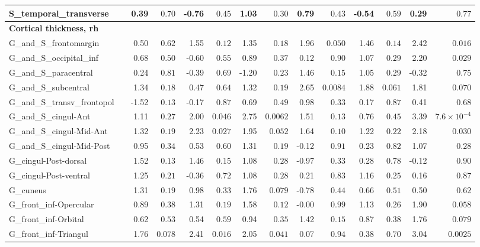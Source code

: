 {\begin{longtable}{llrrrrrrrrrrrr}
S\_temporal\_transverse &  & 0.39 & $0.70$ & -0.76 & $0.45$ & 1.03 & $0.30$ & 0.79 & $0.43$ & -0.54 & $0.59$ & 0.29 & $0.77$ \\
\midrule\multicolumn{14}{l}{\textbf{Cortical thickness, rh}} \\
G\_and\_S\_frontomargin &  & 0.50 & $0.62$ & 1.55 & $0.12$ & 1.35 & $0.18$ & 1.96 & $0.050$ & 1.46 & $0.14$ & 2.42 & $0.016$ \\
G\_and\_S\_occipital\_inf &  & 0.68 & $0.50$ & -0.60 & $0.55$ & 0.89 & $0.37$ & 0.12 & $0.90$ & 1.07 & $0.29$ & 2.20 & $0.029$ \\
G\_and\_S\_paracentral &  & 0.24 & $0.81$ & -0.39 & $0.69$ & -1.20 & $0.23$ & 1.46 & $0.15$ & 1.05 & $0.29$ & -0.32 & $0.75$ \\
G\_and\_S\_subcentral &  & 1.34 & $0.18$ & 0.47 & $0.64$ & 1.32 & $0.19$ & 2.65 & $0.0084$ & 1.88 & $0.061$ & 1.81 & $0.070$ \\
G\_and\_S\_transv\_frontopol &  & -1.52 & $0.13$ & -0.17 & $0.87$ & 0.69 & $0.49$ & 0.98 & $0.33$ & 0.17 & $0.87$ & 0.41 & $0.68$ \\
G\_and\_S\_cingul-Ant &  & 1.11 & $0.27$ & 2.00 & $0.046$ & 2.75 & $0.0062$ & 1.51 & $0.13$ & 0.76 & $0.45$ & 3.39 & $7.6{\times}10^{-4}$ \\
G\_and\_S\_cingul-Mid-Ant &  & 1.32 & $0.19$ & 2.23 & $0.027$ & 1.95 & $0.052$ & 1.64 & $0.10$ & 1.22 & $0.22$ & 2.18 & $0.030$ \\
G\_and\_S\_cingul-Mid-Post &  & 0.95 & $0.34$ & 0.53 & $0.60$ & 1.31 & $0.19$ & -0.12 & $0.91$ & 0.23 & $0.82$ & 1.07 & $0.28$ \\
G\_cingul-Post-dorsal &  & 1.52 & $0.13$ & 1.46 & $0.15$ & 1.08 & $0.28$ & -0.97 & $0.33$ & 0.28 & $0.78$ & -0.12 & $0.90$ \\
G\_cingul-Post-ventral &  & 1.25 & $0.21$ & -0.36 & $0.72$ & 1.08 & $0.28$ & 0.21 & $0.83$ & 1.16 & $0.25$ & 0.16 & $0.87$ \\
G\_cuneus &  & 1.31 & $0.19$ & 0.98 & $0.33$ & 1.76 & $0.079$ & -0.78 & $0.44$ & 0.66 & $0.51$ & 0.50 & $0.62$ \\
G\_front\_inf-Opercular &  & 0.89 & $0.38$ & 1.31 & $0.19$ & 1.58 & $0.12$ & -0.00 & $0.99$ & 1.13 & $0.26$ & 1.90 & $0.058$ \\
G\_front\_inf-Orbital &  & 0.62 & $0.53$ & 0.54 & $0.59$ & 0.94 & $0.35$ & 1.42 & $0.15$ & 0.87 & $0.38$ & 1.76 & $0.079$ \\
G\_front\_inf-Triangul &  & 1.76 & $0.078$ & 2.41 & $0.016$ & 2.05 & $0.041$ & 0.07 & $0.94$ & 0.38 & $0.70$ & 3.04 & $0.0025$ \\

\end{longtable}}
